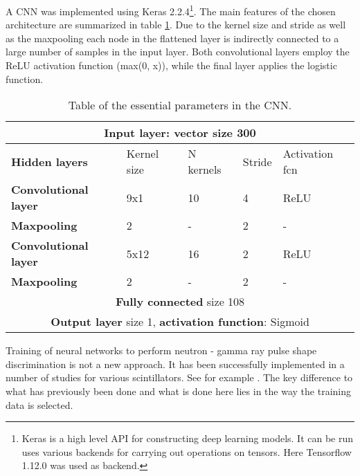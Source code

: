 \documentclass[main.tex]{subfiles}
\begin{document}
A CNN was implemented using Keras 2.2.4\footnote{Keras is a high level API for constructing deep learning models. It can be run uses various backends for carrying out operations on tensors. Here Tensorflow 1.12.0 was used as backend.}\cite{keras}. The main features of the chosen architecture are summarized in table \ref{tab:architecture}. Due to the kernel size and stride as well as the maxpooling each node in the flattened layer is indirectly connected to a large number of samples in the input layer. Both convolutional layers employ the ReLU activation function (max(0, x)), while the final layer applies the logistic function.
\begin{table}[h]
\center
\begin{tabular}{|l|l|l|l|l|}
\hline
\multicolumn{5}{|c|}{\textbf{Input layer}: vector size 300}                                            \\ \hline
\textbf{Hidden layers}       & Kernel size & N kernels & Stride & Activation fcn \\ \hline
\textbf{Convolutional layer} & 9x1           & 10                & 4             & ReLU                \\ \hline
\textbf{Maxpooling}          & 2           & -                 & 2             & -                   \\ \hline
\textbf{Convolutional layer} & 5x12           & 16                & 2             & ReLU                \\ \hline
\textbf{Maxpooling}          & 2           & -                 & 2             & -                   \\ \hline
\multicolumn{5}{|c|}{\textbf{Fully connected} size 108}
\\ \hline
\multicolumn{5}{|c|}{\textbf{Output layer} size 1, \textbf{activation function}: Sigmoid}               \\ \hline
\end{tabular}
\caption{Table of the essential parameters in the CNN.}
\label{tab:architecture}
\end{table}

Training of neural networks to perform neutron - gamma ray pulse shape discrimination is not a new approach. It has been successfully implemented in a number of studies for various scintillators. See for example \cite{Griffiths}. The key difference to what has previously been done and what is done here lies in the way the training data is selected.
\end{document}
